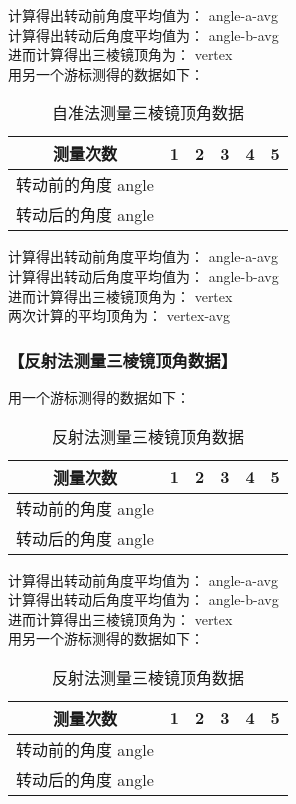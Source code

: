 \documentclass{ctexart}
\let\oldsubsubsection\subsubsection
\renewcommand{\subsubsection}[1]{\oldsubsubsection{\!\!\!\!\!\!【#1】}}
\begin{document}
计算得出转动前角度平均值为：{{ angle-a-avg }} \\
计算得出转动后角度平均值为：{{ angle-b-avg }} \\
进而计算得出三棱镜顶角为：{{ vertex }} \\

用另一个游标测得的数据如下：

\begin{table}[H]
  \centering
  \begin{tabular}{|c|c|c|c|c|c|}
    \hline
     测量次数           & 1 & 2 & 3 & 4 & 5 \\\hline
     转动前的角度 {{ angle }}\\\hline
     转动后的角度 {{ angle }}\\\hline
  \end{tabular}
  \caption{自准法测量三棱镜顶角数据}
\end{table}

计算得出转动前角度平均值为：{{ angle-a-avg }} \\
计算得出转动后角度平均值为：{{ angle-b-avg }} \\
进而计算得出三棱镜顶角为：{{ vertex }} \\
两次计算的平均顶角为：{{ vertex-avg }}

\subsubsection{反射法测量三棱镜顶角数据}

用一个游标测得的数据如下：

\begin{table}[H]
  \centering
  \begin{tabular}{|c|c|c|c|c|c|}
    \hline
     测量次数           & 1 & 2 & 3 & 4 & 5 
     \\\hline
     转动前的角度 {{ angle }}\\\hline
     转动后的角度 {{ angle }}\\\hline
  \end{tabular}
  \caption{反射法测量三棱镜顶角数据}
\end{table}

计算得出转动前角度平均值为：{{ angle-a-avg }} \\
计算得出转动后角度平均值为：{{ angle-b-avg }} \\
进而计算得出三棱镜顶角为：{{ vertex }} \\

用另一个游标测得的数据如下：

\begin{table}[H]
  \centering
  \begin{tabular}{|c|c|c|c|c|c|}
    \hline
     测量次数           & 1 & 2 & 3 & 4 & 5 \\\hline
     转动前的角度 {{ angle }}\\\hline
     转动后的角度 {{ angle }}\\\hline
  \end{tabular}
  \caption{反射法测量三棱镜顶角数据}
\end{table}
\end{document}
